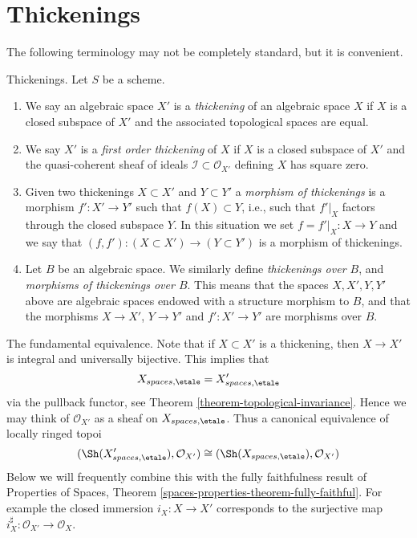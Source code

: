 \section{Thickenings}
\label{section-thickenings}

\noindent
The following terminology may not be completely standard, but it is convenient.

\begin{definition}
\label{definition-thickening}
Thickenings. Let $S$ be a scheme.
\begin{enumerate}
\item We say an algebraic space $X'$ is a {\it thickening} of an algebraic
space $X$ if $X$ is a closed subspace of $X'$ and the associated topological
spaces are equal.
\item We say $X'$ is a {\it first order thickening} of $X$ if
$X$ is a closed subspace of $X'$ and the quasi-coherent sheaf of ideals
$\mathcal{I} \subset \mathcal{O}_{X'}$ defining $X$ has square zero.
\item Given two thickenings $X \subset X'$ and $Y \subset Y'$ a
{\it morphism of thickenings} is a morphism $f' : X' \to Y'$ such that
$f(X) \subset Y$, i.e., such that $f'|_X$ factors through the closed
subspace $Y$. In this situation we set $f = f'|_X : X \to Y$ and we say
that $(f, f') : (X \subset X') \to (Y \subset Y')$ is a morphism of
thickenings.
\item Let $B$ be an algebraic space. We similarly define
{\it thickenings over $B$}, and
{\it morphisms of thickenings over $B$}. This means that the spaces
$X, X', Y, Y'$ above are algebraic spaces endowed with a structure
morphism to $B$, and that the morphisms
$X \to X'$, $Y \to Y'$ and $f' : X' \to Y'$ are morphisms over $B$.
\end{enumerate}
\end{definition}

\noindent
The fundamental equivalence.
Note that if $X \subset X'$ is a thickening, then $X \to X'$
is integral and universally bijective. This implies that
\begin{equation}
\label{equation-equivalence-etale-spaces}
X_{spaces, \etale} = X'_{spaces, \etale}
\end{equation}
via the pullback functor, see
Theorem \ref{theorem-topological-invariance}.
Hence we may think of $\mathcal{O}_{X'}$ as a sheaf on
$X_{spaces, \etale}$. Thus a canonical equivalence
of locally ringed topoi
\begin{equation}
\label{equation-fundamental-equivalence}
(\Sh(X'_{spaces, \etale}), \mathcal{O}_{X'})
\cong
(\Sh(X_{spaces, \etale}), \mathcal{O}_{X'})
\end{equation}
Below we will frequently combine this with the fully faithfulness result of
Properties of Spaces, Theorem \ref{spaces-properties-theorem-fully-faithful}.
For example the closed immersion $i_X : X \to X'$ corresponds
to the surjective map $i_X^\sharp : \mathcal{O}_{X'} \to \mathcal{O}_X$.

